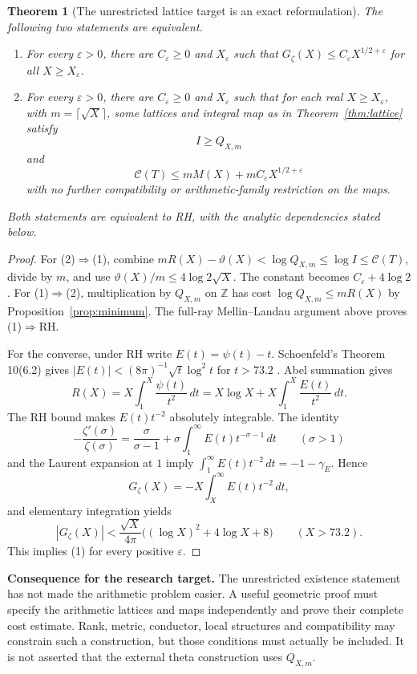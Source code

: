 \documentclass[11pt,letterpaper]{article}
\newtheorem{theorem}{Theorem}[section]
\theoremstyle{definition}
\theoremstyle{remark}
\newcommand{\Z}{\mathbb Z}
\numberwithin{equation}{section}
\begin{document}
\begin{theorem}[The unrestricted lattice target is an exact reformulation]\label{cor:target}
The following two statements are equivalent.
\begin{enumerate}
\item For every $\varepsilon>0$, there are $C_\varepsilon\ge0$ and $X_\varepsilon$ such that $G_\zeta(X)\le C_\varepsilon X^{1/2+\varepsilon}$ for all $X\ge X_\varepsilon$.
\item For every $\varepsilon>0$, there are $C_\varepsilon\ge0$ and $X_\varepsilon$ such that for each real $X\ge X_\varepsilon$, with $m=\lceil\sqrt X\rceil$, some lattices and integral map as in Theorem~\ref{thm:lattice} satisfy
\[
 I\ge Q_{X,m}
\]
and
\[
 \mathcal C(T)
 \le mM(X)+mC_\varepsilon X^{1/2+\varepsilon}
\]
with no further compatibility or arithmetic-family restriction on the maps.
\end{enumerate}
Both statements are equivalent to RH, with the analytic dependencies stated below.
\end{theorem}
\begin{proof}
For (2)$\Rightarrow$(1), combine
$mR(X)-\vartheta(X)<\log Q_{X,m}\le\log I\le\mathcal C(T)$,
divide by $m$, and use $\vartheta(X)/m\le4\log2\sqrt X$. The constant becomes $C_\varepsilon+4\log2$.
For (1)$\Rightarrow$(2), multiplication by $Q_{X,m}$ on $\Z$ has cost $\log Q_{X,m}\le mR(X)$ by Proposition~\ref{prop:minimum}. The full-ray Mellin--Landau argument above proves (1)$\Rightarrow$RH.

For the converse, under RH write $E(t)=\psi(t)-t$. Schoenfeld's Theorem 10(6.2) gives
$|E(t)|<(8\pi)^{-1}\sqrt t\log^2t$ for $t>73.2$ \cite{schoenfeld}.
Abel summation gives
\[
 R(X)=X\int_1^X\frac{\psi(t)}{t^2}\,dt
     =X\log X+X\int_1^X\frac{E(t)}{t^2}\,dt.
\]
The RH bound makes $E(t)t^{-2}$ absolutely integrable. The identity
\[
 -\frac{\zeta'(\sigma)}{\zeta(\sigma)}
 =\frac{\sigma}{\sigma-1}+\sigma\int_1^\infty E(t)t^{-\sigma-1}\,dt
 \qquad(\sigma>1)
\]
and the Laurent expansion at $1$ imply $\int_1^\infty E(t)t^{-2}\,dt=-1-\gamma_E$. Hence
\[
 G_\zeta(X)=-X\int_X^\infty E(t)t^{-2}\,dt,
\]
and elementary integration yields
\[
 |G_\zeta(X)|<\frac{\sqrt X}{4\pi}
    \bigl((\log X)^2+4\log X+8\bigr)\qquad(X>73.2).
\]
This implies (1) for every positive $\varepsilon$.
\end{proof}

\textbf{Consequence for the research target.} The unrestricted existence statement has not made the arithmetic problem easier. A useful geometric proof must specify the arithmetic lattices and maps independently and prove their complete cost estimate. Rank, metric, conductor, local structures and compatibility may constrain such a construction, but those conditions must actually be included. It is not asserted that the external theta construction uses $Q_{X,m}$.
\end{document}
